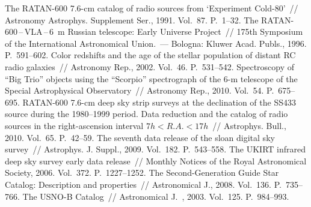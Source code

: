 \begin{multicols}{2}
{{\begin{thebibliography}{99}
The  RATAN-600 7.6-cm catalog of radio sources from `Experiment Cold-80'~// Astronomy 
Astrophys. Supplement Ser., 1991. Vol.~87. P.~1--32.
 The RATAN-600\,--\,VLA\,--\,6~m Russian telescope: 
Early Universe Project~// 
175th Symposium of the International Astronomical Union.~---  Bologna: Kluwer Acad. 
Publs., 1996. P.~591--602.
 Color  redshifts and the age of the stellar population of distant RC 
radio galaxies~// Astronomy  Rep., 2002. Vol.~46. P.~531--542.
Spectroscopy of ``Big Trio'' objects using the 
``Scorpio'' spectrograph of the 6-m telescope of the Special Astrophysical Observatory~// 
Astronomy Rep., 2010. Vol.~54. P.~675--695.
RATAN-600 7.6-cm deep sky strip surveys at the declination of the SS433 source during the 
1980--1999  period. Data reduction and the catalog of radio sources in the right-ascension 
interval  $7h < R.A. < 17h$~// Astrophys. Bull., 2010. Vol.~65. P.~42--59.
 The seventh data release 
of the sloan digital sky survey~// Astrophys. J. Suppl., 2009. Vol.~182. P.~543--558.
The UKIRT infrared deep sky survey early data release~// Monthly Notices of the Royal 
Astronomical Society, 2006. Vol.~372. P.~1227--1252.
The Second-Generation 
Guide Star Catalog: Description and properties~// Astronomical J., 2008. Vol.~136. P.~735--766.
The USNO-B Catalog~// 
Astronomical J.~, 2003. Vol.~125. P.~984--993.

\end{thebibliography}}}
\end{multicols}
